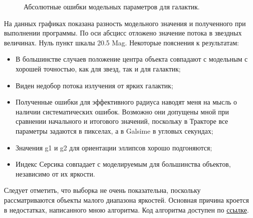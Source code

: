 \documentclass[12pt,a4paper]{article}
\begin{document}
\begin{figure}
    \caption{Абсолютные ошибки модельных параметров для галактик.} \label{pic5}
\end{figure}


На данных графиках показана разность модельного значения и полученного при выполнении программы. По оси абсцисс отложено значение потока в звездных величинах. Нуль пункт шкалы 20.5 Mag. Некоторые пояснения к результатам:

\begin{itemize}
    \item В большинстве случаев положение центра объекта совпадают с модельным с хорошей точностью, как для звезд, так и для галактик;
    \item Виден недобор потока излучения от ярких галактик;
    \item Полученные ошибки для эффективного радиуса наводят меня на мысль о наличии систематических ошибок. Возможно они допущены мной при сравнении начального и итогового значений, поскольку в Тракторе все параметры задаются в пикселах, а в Galsime в угловых секундах; 
    \item Значения g1 и g2 для ориентации эллипсов хорошо подгоняются;
    \item Индекс Серсика совпадает с моделируемым для большинства объектов, независимо от их яркости.
\end{itemize}

Следует отметить, что выборка не очень показательна, поскольку рассматриваются объекты малого диапазона яркостей. Основная причина кроется в недостатках, написанного мною алгоритма. Код алгоритма доступен по \href{https://github.com/LAstroNomer/Coursework}{ссылке}.
\end{document}
